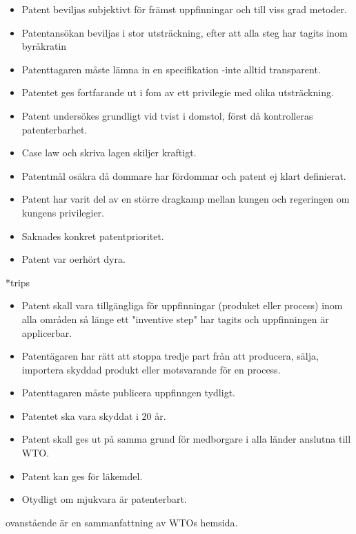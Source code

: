 \begin{itemize}
	\item Patent beviljas subjektivt för främst uppfinningar och till viss grad metoder.
	\item Patentansökan beviljas i stor utsträckning, efter att alla steg har tagits inom byråkratin
	\item Patenttagaren måste lämna in en specifikation -inte alltid transparent.
	\item Patentet ges fortfarande ut i fom av ett privilegie med olika utsträckning.
	\item Patent undersökes grundligt vid tvist i domstol, först då kontrolleras patenterbarhet.
	\item Case law och skriva lagen skiljer kraftigt.
	\item Patentmål osäkra då dommare har fördommar och patent ej klart definierat.
	\item Patent har varit del av en större dragkamp mellan kungen och regeringen om kungens privilegier. 
	\item Saknades konkret patentprioritet.
	\item Patent var oerhört dyra.
\end{itemize}

*trips

\begin{itemize}
	\item Patent skall vara tillgängliga för uppfinningar (produket eller process) inom alla områden så länge ett "inventive step" har tagits och uppfinningen är applicerbar.
	\item Patentägaren har rätt att stoppa tredje part från att producera, sälja, importera skyddad produkt eller motsvarande för en process.
	\item Patenttagaren måste publicera uppfinngen tydligt.
	\item Patentet ska vara skyddat i 20 år.
	\item Patent skall ges ut på samma grund för medborgare i alla länder anslutna till WTO.
	\item Patent kan ges för läkemdel.
	\item Otydligt om mjukvara är patenterbart.
\end{itemize}	

ovanstående är en sammanfattning av WTOs hemsida\cite{wto}.